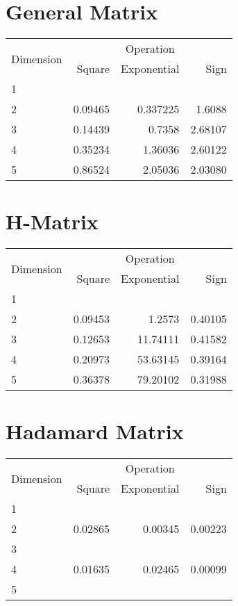 \documentclass{article}
\begin{document}
\section{General Matrix}
\begin{tabular}{@{}lrrr@{}}
\toprule
\multirow{2}{*}{Dimension} & \multicolumn{3}{c}{Operation} \\
\cmidrule(l){2-4}
& Square & Exponential & Sign \\
\midrule
1 & & & \\
2 & 0.09465 & 0.337225 & 1.6088 \\
3 & 0.14439 & 0.7358 & 2.68107 \\
4 & 0.35234 & 1.36036 & 2.60122 \\
5 & 0.86524 & 2.05036 & 2.03080 \\
\bottomrule
\end{tabular}

\section{H-Matrix}
\begin{tabular}{@{}lrrr@{}}
\toprule
\multirow{2}{*}{Dimension} & \multicolumn{3}{c}{Operation} \\
\cmidrule(l){2-4}
& Square & Exponential & Sign \\
\midrule
1 & & & \\
2 & 0.09453 & 1.2573 & 0.40105 \\
3 & 0.12653 & 11.74111 & 0.41582 \\
4 & 0.20973 & 53.63145 & 0.39164 \\
5 & 0.36378 & 79.20102 & 0.31988 \\
\bottomrule
\end{tabular}

\section{Hadamard Matrix}
\begin{tabular}{@{}lrrr@{}}
\toprule
\multirow{2}{*}{Dimension} & \multicolumn{3}{c}{Operation} \\
\cmidrule(l){2-4}
& Square & Exponential & Sign \\
\midrule
1 & & & \\
2 & 0.02865 & 0.00345 & 0.00223 \\
3 & & & \\
4 & 0.01635 & 0.02465 & 0.00099 \\
5 & & & \\
\bottomrule
\end{tabular}
\end{document}
